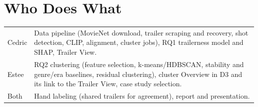 \documentclass[10pt]{article}
\begin{document}
\section{Who Does What}
\begin{tabularx}{\linewidth}{@{}lX@{}}
Cedric & Data pipeline (MovieNet download, trailer scraping and recovery, shot detection, CLIP, alignment, cluster jobs), RQ1 trailerness model and SHAP, Trailer View. \\
Estee & RQ2 clustering (feature selection, k-means/HDBSCAN, stability and genre/era baselines, residual clustering), cluster Overview in D3 and its link to the Trailer View, case study selection. \\
Both & Hand labeling (shared trailers for agreement), report and presentation.
\end{tabularx}
\end{document}
